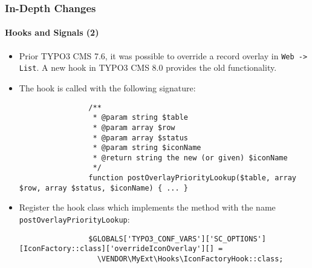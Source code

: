 \begin{frame}[fragile]
	\frametitle{In-Depth Changes}
	\framesubtitle{Hooks and Signals (2)}

	\lstset{basicstyle=\tiny\ttfamily}

	\begin{itemize}

		\item Prior TYPO3 CMS 7.6, it was possible to override a record overlay in \texttt{Web -> List}.
			A new hook in TYPO3 CMS 8.0 provides the old functionality.

		\item The hook is called with the following signature:
			\begin{lstlisting}
				/**
				 * @param string $table
				 * @param array $row
				 * @param array $status
				 * @param string $iconName
				 * @return string the new (or given) $iconName
				 */
				function postOverlayPriorityLookup($table, array $row, array $status, $iconName) { ... }
			\end{lstlisting}

		\item Register the hook class which implements the method with the name \texttt{postOverlayPriorityLookup}:

			\begin{lstlisting}
				$GLOBALS['TYPO3_CONF_VARS']['SC_OPTIONS'][IconFactory::class]['overrideIconOverlay'][] =
				  \VENDOR\MyExt\Hooks\IconFactoryHook::class;
			\end{lstlisting}

	\end{itemize}

\end{frame}

